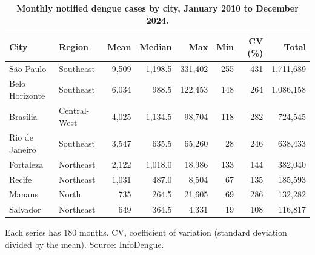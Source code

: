 
\begin{table}[!ht]
\centering
\small
\caption{\textbf{Monthly notified dengue cases by city, January 2010 to December 2024.}}
\begin{tabular}{llrrrrrr}
\toprule
City & Region & Mean & Median & Max & Min & CV (\%) & Total \\
\midrule
S\~ao Paulo & Southeast & 9{{,}}509 & 1{,}198.5 & 331{,}402 & 255 & 431 & 1{,}711{,}689 \\
Belo Horizonte & Southeast & 6{{,}}034 & 988.5 & 122{,}453 & 148 & 264 & 1{,}086{,}158 \\
Bras\'ilia & Central-West & 4{{,}}025 & 1{,}134.5 & 98{,}704 & 118 & 282 & 724{,}545 \\
Rio de Janeiro & Southeast & 3{{,}}547 & 635.5 & 65{,}260 & 28 & 246 & 638{,}433 \\
Fortaleza & Northeast & 2{{,}}122 & 1{,}018.0 & 18{,}986 & 133 & 144 & 382{,}040 \\
Recife & Northeast & 1{{,}}031 & 487.0 & 8{,}504 & 67 & 135 & 185{,}593 \\
Manaus & North & 735 & 264.5 & 21{,}605 & 69 & 286 & 132{,}282 \\
Salvador & Northeast & 649 & 364.5 & 4{,}331 & 19 & 108 & 116{,}817 \\
\bottomrule
\end{tabular}
\begin{flushleft} Each series has 180 months. CV, coefficient of variation (standard deviation divided by the mean). Source: InfoDengue.
\end{flushleft}
\label{table1}
\end{table}
